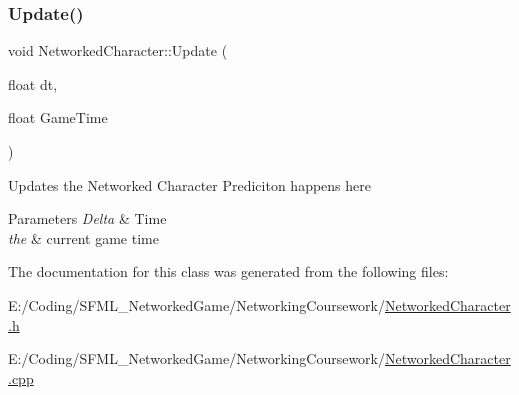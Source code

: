\subsubsection{\texorpdfstring{Update()}{Update()}}
{\footnotesize\ttfamily void Networked\+Character\+::\+Update (\begin{DoxyParamCaption}\item[{float}]{dt,  }\item[{float}]{Game\+Time }\end{DoxyParamCaption})}

Updates the Networked Character Prediciton happens here


\begin{DoxyParams}{Parameters}
{\em Delta} & Time \\
\hline
{\em the} & current game time \\
\hline
\end{DoxyParams}


The documentation for this class was generated from the following files\+:\begin{DoxyCompactItemize}
\item 
E\+:/\+Coding/\+S\+F\+M\+L\+\_\+\+Networked\+Game/\+Networking\+Coursework/\hyperlink{_networked_character_8h}{Networked\+Character.\+h}\item 
E\+:/\+Coding/\+S\+F\+M\+L\+\_\+\+Networked\+Game/\+Networking\+Coursework/\hyperlink{_networked_character_8cpp}{Networked\+Character.\+cpp}\end{DoxyCompactItemize}
